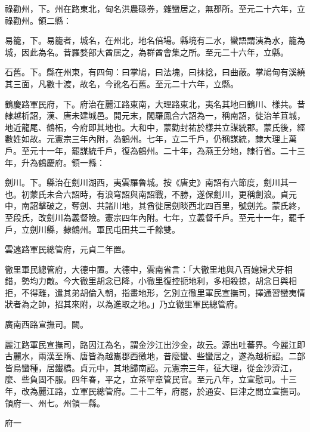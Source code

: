 \begin{pinyinscope}
 祿勸州，下。州在路東北，甸名洪農碌券，雜蠻居之，無郡所。至元二十六年，立祿勸州。領二縣：



 易籠，下。易籠者，城名，在州北，地名倍場。縣境有二水，蠻語謂洟為水，籠為城，因此為名。昔羅婺部大酋居之，為群酋會集之所。至元二十六年，立縣。



 石舊。下。縣在州東，有四甸：曰掌鳩，曰法塊，曰抹捻，曰曲蔽。掌鳩甸有溪繞其三面，凡數十渡，故名，今訛名石舊。至元二十六年，立縣。



 鶴慶路軍民府，下。府治在麗江路東南，大理路東北，夷名其地曰鶴川、樣共。昔隸越析詔，漢、唐未建城邑。開元末，閣羅鳳合六詔為一，稱南詔，徙治羊苴城，地近龍尾、鶴柘，今府即其地也。大和中，蒙勸封祐於樣共立謀統郡。蒙氏後，經數姓如故。元憲宗三年內附，為鶴州。七年，立二千戶，仍稱謀統，隸大理上萬戶。至元十一年，罷謀統千戶，復為鶴州。二十年，為燕王分地，隸行省。二十三年，升為鶴慶府。領一縣：



 劍川。下。縣治在劍川湖西，夷雲羅魯城。按《唐史》南詔有六節度，劍川其一也。初蒙氏未合六詔時，有浪穹詔與南詔戰，不勝，遂保劍川，更稱劍浪。貞元中，南詔擊破之，奪劍、共諸川地，其酋徙居劍睒西北四百里，號劍羌。蒙氏終，至段氏，改劍川為義督瞼。憲宗四年內附。七年，立義督千戶。至元十一年，罷千戶，立劍川縣，隸鶴州。軍民屯田共二千餘雙。



 雲遠路軍民總管府，元貞二年置。



 徹里軍民總管府，大德中置。大德中，雲南省言：「大徹里地與八百媳婦犬牙相錯，勢均力敵。今大徹里胡念已降，小徹里復控扼地利，多相殺掠，胡念日與相拒，不得離，遣其弟胡倫入朝，指畫地形，乞別立徹里軍民宣撫司，擇通習蠻夷情狀者為之帥，招其來附，以為進取之地。」乃立徹里軍民總管府。



 廣南西路宣撫司。闕。



 麗江路軍民宣撫司，路因江為名，謂金沙江出沙金，故云。源出吐蕃界。今麗江即古麗水，兩漢至隋、唐皆為越巂郡西徼地，昔麼蠻、些蠻居之，遂為越析詔。二部皆烏蠻種，居鐵橋。貞元中，其地歸南詔。元憲宗三年，征大理，從金沙濟江，麼、些負固不服。四年春，平之，立茶罕章管民官。至元八年，立宣慰司。十三年，改為麗江路，立軍民總管府。二十二年，府罷，於通安、巨津之間立宣撫司。領府一、州七。州領一縣。



 府一




\end{pinyinscope}
